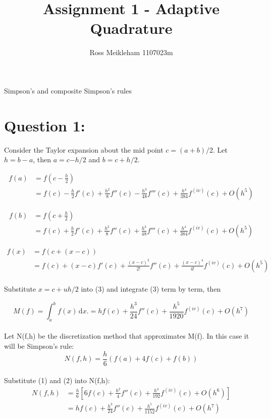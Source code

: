 \documentclass[fleqn]{report}
\begin{document}
\title{Assignment 1 - Adaptive Quadrature}
\author{Ross Meikleham 1107023m}

Simpson's and composite Simpson's rules

\section{Question 1:}

Consider the Taylor expansion about the mid point $c = (a+b)/2$. 
Let $h =b-a$, then $a =c$$-h/2$ and $b=c+h/2$.

\begin{equation}
\begin{split}
f(a) & =f(c - \frac{h}{2})\\
& = f(c) - \frac{h}{2}f'(c) + \frac{h^2}{8}f''(c) - \frac{h^3}{48}f'''(c) + \frac{h^4}{384}f^{(iv)}(c) + O(h^5)
\end{split}
\end{equation}

\begin{equation}
\begin{split}
f(b) & =f(c + \frac{h}{2})\\
& = f(c) + \frac{h}{2}f'(c) + \frac{h^2}{8}f''(c) + \frac{h^3}{48}f'''(c) + \frac{h^4}{384}f^{(iv)}(c) + O(h^5)
\end{split}
\end{equation}

\begin{equation}
\begin{split}
f(x) & =f(c + (x - c))\\
& = f(c) + (x - c)f'(c) + \frac{(x-c)^2}{2!}f''(c) + \frac{(x-c)^4}{4!}f^{(iv)}(c) + O(h^5) 
\end{split}
\end{equation}
\\
Substitute $x=c+uh/2$ into (3) and integrate (3) term by term, then

\begin{equation}
M(f) = \int_a^b \! f(x) \, \mathrm{d}x. 
= hf(c) + \frac{h^3}{24}f''(c) + \frac{h^5}{1920}f^{(iv)}(c) + O(h^7)
\end{equation}
\\
Let N(f,h) be the discretization method that approximates M(f). In this case it will be Simpson's rule:
\begin{equation}
N(f,h) = \frac{h}{6}(f(a) + 4f(c) + f(b))
\end{equation}
\\
Substitute (1) and (2) into N(f,h):
\begin{equation}
\begin{split}
N(f,h) & =\frac{h}{6}[6f(c) + \frac{h^2}{4}f''(c) + \frac{h^4}{192}f^{(iv)}(c) + O(h^6)]\\
& = hf(c) + \frac{h^3}{24}f''(c) + \frac{h^5}{1152}f^{(iv)}(c) + O(h^7)
\end{split}
\end{equation}
\end{document}
